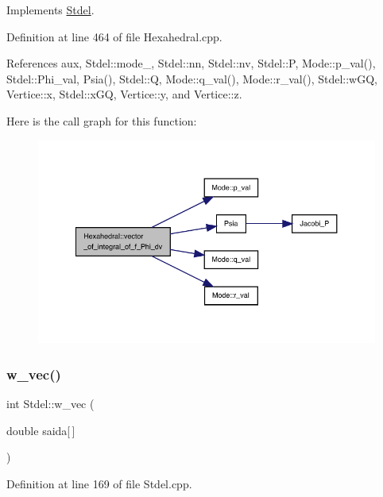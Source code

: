 Implements \hyperlink{classStdel_a3a22725f255ab04520ce1744eef8e2c0}{Stdel}.



Definition at line 464 of file Hexahedral.\+cpp.



References aux, Stdel\+::mode\+\_\+, Stdel\+::nn, Stdel\+::nv, Stdel\+::P, Mode\+::p\+\_\+val(), Stdel\+::\+Phi\+\_\+val, Psia(), Stdel\+::Q, Mode\+::q\+\_\+val(), Mode\+::r\+\_\+val(), Stdel\+::w\+GQ, Vertice\+::x, Stdel\+::x\+GQ, Vertice\+::y, and Vertice\+::z.

Here is the call graph for this function\+:
\nopagebreak
\begin{figure}[H]
\begin{center}
\leavevmode
\includegraphics[width=350pt]{classHexahedral_acbbaec7da99759f1d6df6587a9825c22_cgraph}
\end{center}
\end{figure}
\mbox{\label{classStdel_a395c8d7d7890a9efdea23932fa22b420}} 
\subsubsection{\texorpdfstring{w\+\_\+vec()}{w\_vec()}}
{\footnotesize\ttfamily int Stdel\+::w\+\_\+vec (\begin{DoxyParamCaption}\item[{double}]{saida\mbox{[}$\,$\mbox{]} }\end{DoxyParamCaption})\hspace{0.3cm}{\ttfamily [inherited]}}



Definition at line 169 of file Stdel.\+cpp.



